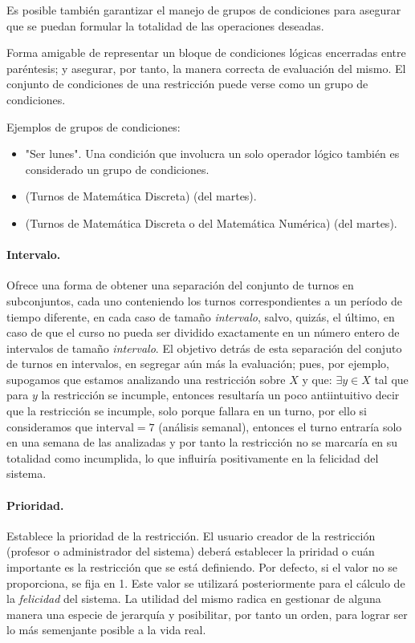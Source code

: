 Es posible también garantizar el manejo de grupos de condiciones para asegurar que se puedan formular la totalidad de las operaciones deseadas.

\begin{dfn}
	Forma amigable de representar un bloque de condiciones lógicas encerradas entre paréntesis; y asegurar, por tanto, la manera correcta de evaluación del mismo. El conjunto de condiciones de una restricción puede verse como un grupo de condiciones.
\end{dfn}

Ejemplos de grupos de condiciones: 
\begin{itemize}
	\item "Ser lunes". Una condición que involucra un solo operador lógico también es considerado un grupo de condiciones.
	\item (Turnos de Matemática Discreta) (del martes). 
	\item (Turnos de Matemática Discreta o del Matemática Numérica) (del martes).
\end{itemize}

\paragraph{Intervalo.}
Ofrece una forma de obtener una separación del  conjunto de turnos en subconjuntos, cada uno conteniendo los turnos correspondientes a un período de tiempo diferente, en cada caso de tamaño \textit{intervalo}, salvo, quizás, el último, en caso de que el curso no pueda ser dividido exactamente en un número 
entero de intervalos de tamaño \textit{intervalo}. El objetivo detrás de esta separación del conjuto de turnos en intervalos, en segregar aún más la evaluación; pues, por ejemplo, supogamos que estamos analizando una restricción sobre $X$ y que: $\exists y \in X $ tal que para $y$ la restricción se incumple, entonces resultaría un poco antiintuitivo decir que la restricción se incumple, solo porque fallara en un turno, por ello si consideramos que $\text{interval} = 7$ (análisis semanal), entonces el turno entraría solo en una semana de las analizadas y por tanto la restricción no se marcaría en su totalidad como incumplida, lo que influiría positivamente en la felicidad del sistema.

\paragraph{Prioridad.}
\label{def:priority}
Establece la prioridad de la restricción. El usuario creador de la restricción (profesor o administrador del sistema) deberá establecer la priridad o cuán importante es la restricción que se está definiendo. Por defecto, si el valor no se proporciona, se fija en 1. Este valor se utilizará posteriormente para el cálculo de la \textit{felicidad} del sistema. La utilidad del mismo radica en gestionar de alguna manera una especie de jerarquía y posibilitar, por tanto un orden, para lograr ser lo más semenjante posible a la vida real.

